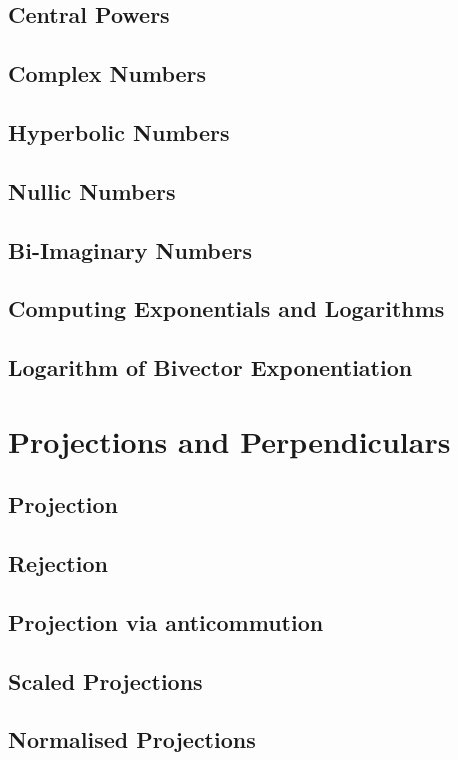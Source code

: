 \documentclass[a4paper]{book}
\numberwithin{equation}{chapter}
\begin{document}
    \subsection{Central Powers}
    \subsection{Complex Numbers}
    \subsection{Hyperbolic Numbers}
    \subsection{Nullic Numbers}
    \subsection{Bi-Imaginary Numbers}
    \subsection{Computing Exponentials and Logarithms}
    \subsection{Logarithm of Bivector Exponentiation}
    

    \section{Projections and Perpendiculars}
    \subsection{Projection}
    \subsection{Rejection}
    \subsection{Projection via anticommution}
    \subsection{Scaled Projections}
    \subsection{Normalised Projections}
\end{document}
